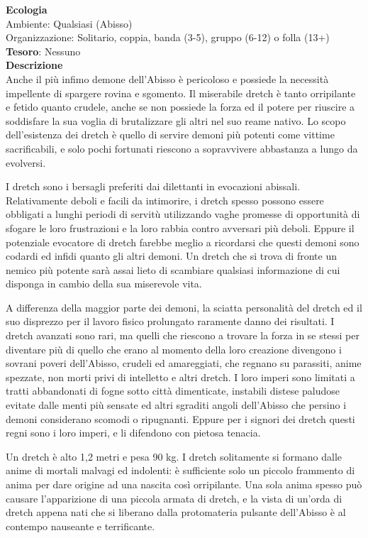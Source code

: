 \begin{multicols}{2}
\textbf{Ecologia}\\
Ambiente: Qualsiasi (Abisso)\\
Organizzazione: Solitario, coppia, banda (3-5), gruppo (6-12) o folla (13+)\\
\textbf{Tesoro}: Nessuno\\
\textbf{Descrizione}\\
Anche il più infimo demone dell'Abisso è pericoloso e possiede la necessità impellente di spargere rovina e sgomento. Il miserabile dretch è tanto orripilante e fetido quanto crudele, anche se non possiede la forza ed il potere per riuscire a soddisfare la sua voglia di brutalizzare gli altri nel suo reame nativo. Lo scopo dell'esistenza dei dretch è quello di servire demoni più potenti come vittime sacrificabili, e solo pochi fortunati riescono a sopravvivere abbastanza a lungo da evolversi.

I dretch sono i bersagli preferiti dai dilettanti in evocazioni abissali. Relativamente deboli e facili da intimorire, i dretch spesso possono essere obbligati a lunghi periodi di servitù utilizzando vaghe promesse di opportunità di sfogare le loro frustrazioni e la loro rabbia contro avversari più deboli. Eppure il potenziale evocatore di dretch farebbe meglio a ricordarsi che questi demoni sono codardi ed infidi quanto gli altri demoni. Un dretch che si trova di fronte un nemico più potente sarà assai lieto di scambiare qualsiasi informazione di cui disponga in cambio della sua miserevole vita.

A differenza della maggior parte dei demoni, la sciatta personalità del dretch ed il suo disprezzo per il lavoro fisico prolungato raramente danno dei risultati. I dretch avanzati sono rari, ma quelli che riescono a trovare la forza in se stessi per diventare più di quello che erano al momento della loro creazione divengono i sovrani poveri dell'Abisso, crudeli ed amareggiati, che regnano su parassiti, anime spezzate, non morti privi di intelletto e altri dretch. I loro imperi sono limitati a tratti abbandonati di fogne sotto città dimenticate, instabili distese paludose evitate dalle menti più sensate ed altri sgraditi angoli dell'Abisso che persino i demoni considerano scomodi o ripugnanti. Eppure per i signori dei dretch questi regni sono i loro imperi, e li difendono con pietosa tenacia.

Un dretch è alto 1,2 metri e pesa 90 kg. I dretch solitamente si formano dalle anime di mortali malvagi ed indolenti: è sufficiente solo un piccolo frammento di anima per dare origine ad una nascita così orripilante. Una sola anima spesso può causare l'apparizione di una piccola armata di dretch, e la vista di un'orda di dretch appena nati che si liberano dalla protomateria pulsante dell'Abisso è al contempo nauseante e terrificante.


\end{multicols}
